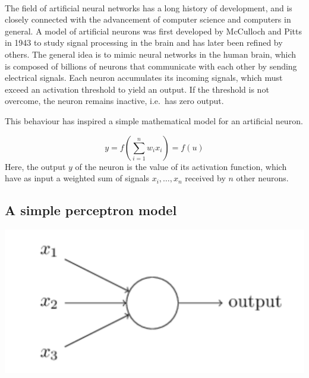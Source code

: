 \documentclass[%
oneside,                 %
final,                   %
10pt]{article}
\begin{document}
\paragraph{}

The field of artificial neural networks has a long history of
development, and is closely connected with the advancement of computer
science and computers in general. A model of artificial neurons was
first developed by McCulloch and Pitts in 1943 to study signal
processing in the brain and has later been refined by others. The
general idea is to mimic neural networks in the human brain, which is
composed of billions of neurons that communicate with each other by
sending electrical signals.  Each neuron accumulates its incoming
signals, which must exceed an activation threshold to yield an
output. If the threshold is not overcome, the neuron remains inactive,
i.e.~has zero output.

This behaviour has inspired a simple mathematical model for an artificial neuron.

\[
 y = f\left(\sum_{i=1}^n w_ix_i\right) = f(u)
\]
Here, the output $y$ of the neuron is the value of its activation function, which have as input
a weighted sum of signals $x_i, \dots ,x_n$ received by $n$ other neurons.



\subsection{A simple perceptron model}



\vspace{6mm}

\centerline{\includegraphics[width=0.9\linewidth]{figures/perceptron.png}}

\vspace{6mm}
\end{document}
